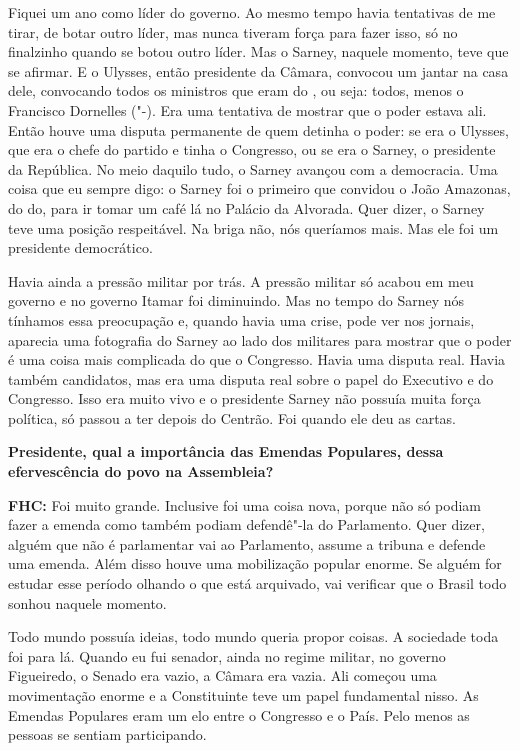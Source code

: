 Fiquei um ano como líder do governo. Ao mesmo tempo havia tentativas de
me tirar, de botar outro líder, mas nunca tiveram força para fazer isso,
só no finalzinho quando se botou outro líder. Mas o Sarney, naquele
momento, teve que se afirmar. E o Ulysses, então presidente da Câmara,
convocou um jantar na casa dele, convocando todos os ministros que eram
do , ou seja: todos, menos o Francisco Dornelles ("-). Era uma
tentativa de mostrar que o poder estava ali. Então houve uma disputa
permanente de quem detinha o poder: se era o Ulysses, que era o chefe do
partido e tinha o Congresso, ou se era o Sarney, o presidente da
República. No meio daquilo tudo, o Sarney avançou com a democracia. Uma
coisa que eu sempre digo: o Sarney foi o primeiro que convidou o João
Amazonas, do do, para ir tomar um café lá no Palácio da Alvorada.
Quer dizer, o Sarney teve uma posição respeitável. Na briga não, nós
queríamos mais. Mas ele foi um presidente democrático.

Havia ainda a pressão militar por trás. A pressão militar só acabou em
meu governo e no governo Itamar foi diminuindo. Mas no tempo do Sarney
nós tínhamos essa preocupação e, quando havia uma crise, pode ver nos
jornais, aparecia uma fotografia do Sarney ao lado dos militares para
mostrar que o poder é uma coisa mais complicada do que o Congresso.
Havia uma disputa real. Havia também candidatos, mas era uma disputa
real sobre o papel do Executivo e do Congresso. Isso era muito vivo e o
presidente Sarney não possuía muita força política, só passou a ter
depois do Centrão. Foi quando ele deu as cartas.

\textbf{Presidente, qual a importância das Emendas Populares, dessa
efervescência do povo na Assembleia? }

\textbf{FHC:} Foi muito grande. Inclusive foi uma coisa nova, porque não
só podiam fazer a emenda como também podiam defendê"-la do Parlamento.
Quer dizer, alguém que não é parlamentar vai ao Parlamento, assume a
tribuna e defende uma emenda. Além disso houve uma mobilização popular
enorme. Se alguém for estudar esse período olhando o que está arquivado,
vai verificar que o Brasil todo sonhou naquele momento.

Todo mundo possuía ideias, todo mundo queria propor coisas. A sociedade
toda foi para lá. Quando eu fui senador, ainda no regime militar, no
governo Figueiredo, o Senado era vazio, a Câmara era vazia. Ali começou
uma movimentação enorme e a Constituinte teve um papel fundamental
nisso. As Emendas Populares eram um elo entre o Congresso e o País. Pelo
menos as pessoas se sentiam participando.


